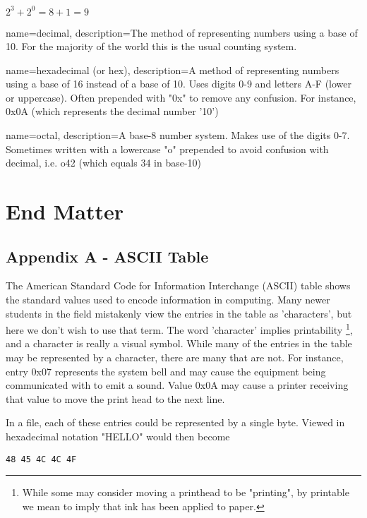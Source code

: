 \documentclass[11pt,fleqn]{book} %
\begin{document}
{$ 2^{3} + 2^{0} = 8 + 1 = 9 $

{
	name=decimal,
	description={The method of representing numbers using a base of 10.  For the majority of the world this is the usual counting system.}
}

{
	name=hexadecimal (or hex),
	description={A method of representing numbers using a base of 16 instead of a base of 10.  Uses digits 0-9 and letters A-F (lower or uppercase).  Often prepended with "0x" to remove any confusion.  For instance, 0x0A (which represents the decimal number '10')}
}

{
	name=octal,
	description={A base-8 number system.  Makes use of the digits 0-7.  Sometimes written with a lowercase "o" prepended to avoid confusion with decimal, i.e. o42 (which equals 34 in base-10)}
}

\part{End Matter}
\chapter*{Appendix A - ASCII Table}
\newcommand*{\thead}[1]{\multicolumn{1}{c}{\bfseries #1}}

The American Standard Code for Information Interchange (ASCII) table shows the standard values used to encode information in computing.  Many newer students in the field mistakenly view the entries in the table as 'characters', but here we don't wish to use that term.  The word 'character' implies printability \footnote{While some may consider moving a printhead to be "printing", by printable we mean to imply that ink has been applied to paper.}, and a character is really a visual symbol.  While many of the entries in the table may be represented by a character, there are many that are not.  For instance, entry 0x07 represents the system bell and may cause the equipment being communicated with to emit a sound.  Value 0x0A may cause a printer receiving that value to move the print head to the next line.

In a file, each of these entries could be represented by a single byte.  Viewed in hexadecimal notation "HELLO" would then become

\begin{verbatim}
48 45 4C 4C 4F
\end{verbatim}

}
\end{document}
